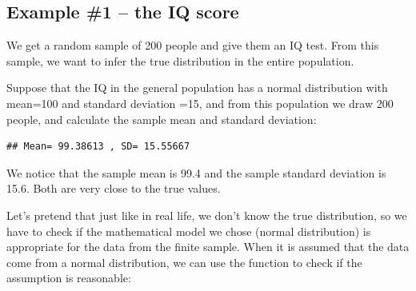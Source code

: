 \subsection{Example \#1 -- the IQ score}
We get a random sample of 200 people and give them an IQ test. From this sample, we want to infer the true distribution in the entire population.

Suppose that the IQ in the general population has a normal distribution with mean=100 and  standard deviation =15, and from this population we draw 200 people, and calculate the sample mean and standard deviation:

\begin{knitrout}
\color{fgcolor}\begin{kframe}
\begin{alltt}
\hlstd{(}\hlstd{)}
 \hlkwb{<-} 
 \hlkwb{<-}  \hlstd{,} \hlstd{)}
\hlstd{(}\hlstd{,} \hlstd{,}\hlstd{)}
\end{alltt}
\begin{verbatim}
## Mean= 99.38613 , SD= 15.55667
\end{verbatim}
\end{kframe}
\end{knitrout}

We notice that the sample mean is 99.4 and the sample standard deviation is 15.6. Both are very close to the true values. 

Let's pretend that just like in real life, we don't know the true distribution, so we have to check if the mathematical model we chose (normal distribution) is appropriate for the data from the finite sample. When it is assumed that the data come from a normal distribution, we can use the  function to check if the assumption is reasonable:

